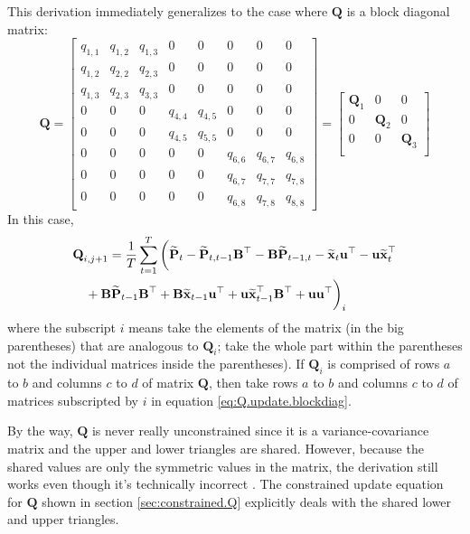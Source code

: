 \documentclass[]{article}
\def\UPS{\mbox{\boldmath $\Upsilon$}}
\def\BB{\mbox{$\mathbf B$}}	\def\bb{\mbox{$\mathbf b$}} \def\Bb{\mbox{$\mathbf J$}} \def\Ba{\mbox{$\mathbf L$}} \def\Bm{\UPS}
\def\PP{\mbox{$\mathbf P$}}  \def\pp{\mbox{$\mathbf p$}}
\def\QQ{\mbox{$\mathbf Q$}}	 \def\qq{\mbox{$\mathbf q$}} \def\Qb{\mbox{$\mathbf G$}}  \def\Qm{\mathbb{Q}}
\def\hatxt{\widetilde{\mbox{$\mathbf x$}}_t}
\def\hatxtm{\widetilde{\mbox{$\mathbf x$}}_{t-1}}
\def\hatPt{\widetilde{\PP}_t}
\def\hatPtm{\widetilde{\PP}_{t-1}}
\def\hatPttm{\widetilde{\PP}_{t,t-1}}
\def\hatPtmt{\widetilde{\PP}_{t-1,t}}
\begin{document}
This derivation immediately generalizes to the case where $\QQ$ is a block diagonal matrix:
\begin{equation*}
\QQ =
\begin{bmatrix}
q_{1,1}&q_{1,2}&q_{1,3}&0&0&0&0&0\\
q_{1,2}&q_{2,2}&q_{2,3}&0&0&0&0&0\\
q_{1,3}&q_{2,3}&q_{3,3}&0&0&0&0&0\\
0&0&0&q_{4,4}&q_{4,5}&0&0&0\\
0&0&0&q_{4,5}&q_{5,5}&0&0&0\\
0&0&0&0&0&q_{6,6}&q_{6,7}&q_{6,8}\\
0&0&0&0&0&q_{6,7}&q_{7,7}&q_{7,8}\\
0&0&0&0&0&q_{6,8}&q_{7,8}&q_{8,8}
\end{bmatrix}
=
\begin{bmatrix}
\QQ_1&0&0\\
0&\QQ_2&0\\
0&0&\QQ_3\\
\end{bmatrix}
\end{equation*}
In this case,
\begin{equation}\label{eq:Q.update.blockdiag}
\begin{split}
&\QQ_{i,j+1} = \frac{1}{T}\sum_{t=1}^T \bigg(  
 \hatPt - \hatPttm \BB^\top - \BB\hatPtmt 
 - \hatxt\uu^\top - \uu \hatxt^\top \\
&\quad + \BB\hatPtm\BB^\top + \BB\hatxtm\uu^\top + \uu\hatxtm^\top\BB^\top 
 + \uu\uu^\top \bigg)_i
\end{split}
\end{equation}
where the subscript $i$ means take the elements of the matrix (in the big parentheses) that are analogous to $\QQ_i$; take the whole part within the parentheses not the individual matrices inside the parentheses).  If $\QQ_i$ is comprised of rows $a$ to $b$ and columns $c$ to $d$ of matrix $\QQ$, then take rows $a$ to $b$ and columns $c$ to $d$ of matrices subscripted by $i$ in equation \ref{eq:Q.update.blockdiag}.

By the way, $\QQ$ is never really unconstrained since it is a variance-covariance matrix and the upper and lower triangles are shared.  However, because the shared values are only the symmetric values in the matrix, the derivation still works even though it's technically incorrect \citep{HendersonSearle1979}.  The constrained update equation for $\QQ$ shown in section \ref{sec:constrained.Q} explicitly deals with the shared lower and upper triangles.
\end{document}
